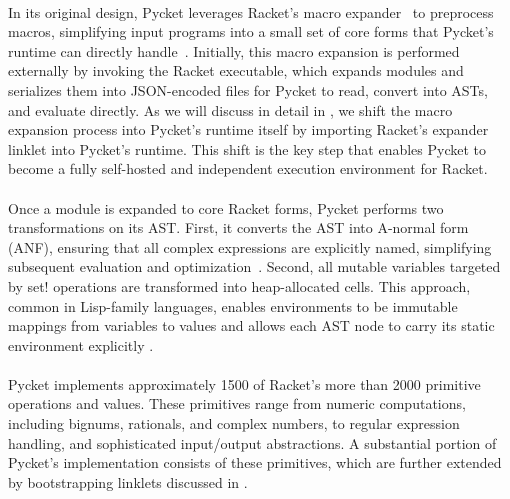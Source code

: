
        \paragraph{}%
            In its original design, Pycket leverages Racket’s macro expander~\cite{flatt:2002} to preprocess macros, simplifying input programs into a small set of core forms that Pycket's runtime can directly handle~\cite{samth:11}. Initially, this macro expansion is performed externally by invoking the Racket executable, which expands modules and serializes them into JSON-encoded files for Pycket to read, convert into ASTs, and evaluate directly. As we will discuss in detail in , we shift the macro expansion process into Pycket's runtime itself by importing Racket's expander linklet into Pycket's runtime. This shift is the key step that enables Pycket to become a fully self-hosted and independent execution environment for Racket.

        \paragraph{}%
            Once a module is expanded to core Racket forms, Pycket performs two transformations on its AST. First, it converts the AST into A-normal form (ANF), ensuring that all complex expressions are explicitly named, simplifying subsequent evaluation and optimization~\cite{danvy:93,flanagan:93}. Second, all mutable variables targeted by set! operations are transformed into heap-allocated cells. This approach, common in Lisp-family languages, enables environments to be immutable mappings from variables to values and allows each AST node to carry its static environment explicitly \cite{pycketmain}.

        \paragraph{}%
            Pycket implements approximately 1500 of Racket’s more than 2000 primitive operations and values. These primitives range from numeric computations, including bignums, rationals, and complex numbers, to regular expression handling, and sophisticated input/output abstractions. A substantial portion of Pycket’s implementation consists of these primitives, which are further extended by bootstrapping linklets discussed in .

